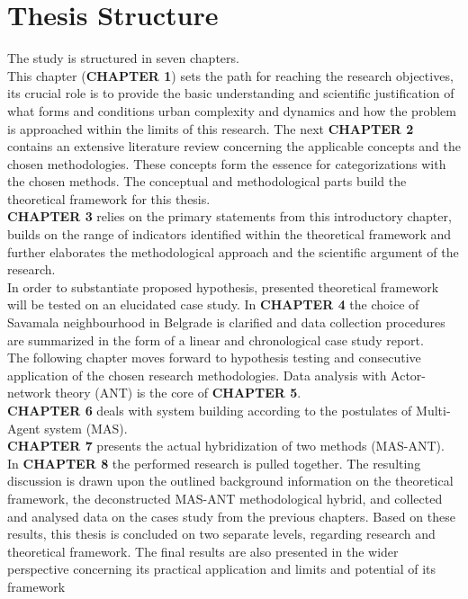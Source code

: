 \documentclass[11pt]{report}
\begin{document}
\section{Thesis Structure}

The study is structured in seven chapters.
\\
This chapter (\textbf{CHAPTER 1}) sets the path for reaching the research objectives, its crucial role is to provide the basic understanding and scientific justification of what forms and conditions urban complexity and dynamics and how the problem is approached within the limits of this research. The next \textbf{CHAPTER 2} contains an extensive literature review concerning the applicable concepts and the chosen methodologies. These concepts form the essence for categorizations with the chosen methods.
The conceptual and methodological parts build the theoretical framework for this thesis. 
\\
\textbf{CHAPTER 3} relies on the primary statements from this introductory chapter, builds on the range of indicators identified within the theoretical framework and further elaborates the methodological approach and the scientific argument of the research.
\\
In order to substantiate proposed hypothesis,  presented  theoretical framework will be tested on an elucidated case study. In \textbf{CHAPTER 4} the choice of Savamala neighbourhood in Belgrade is clarified and data collection procedures are summarized in the form of a linear and chronological case study report.
\\
The following chapter moves forward to hypothesis testing and consecutive application of the chosen research methodologies. Data analysis with Actor-network theory (ANT) is the core of \textbf{CHAPTER 5}.
\\
\textbf{CHAPTER 6} deals with system building according to the postulates of Multi-Agent system (MAS).
\\
\textbf{CHAPTER 7} presents the actual hybridization of two methods (MAS-ANT).
\\
In \textbf{CHAPTER 8} the performed research is pulled together. The resulting discussion is drawn upon the outlined background information on the theoretical framework, the deconstructed MAS-ANT methodological hybrid, and collected and analysed data on the cases study from the previous chapters. Based on these results, this thesis is concluded on two separate levels, regarding research and theoretical framework. The final results are also presented in the wider perspective concerning its practical application and limits and potential of its framework
\end{document}
